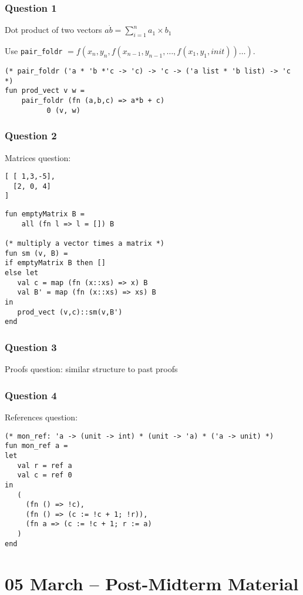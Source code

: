 \documentclass[11pt]{article}
\begin{document}
\subsubsection{Question 1}
Dot product of two vectors $a \dot b = \sum_{i=1}^n a_1 \times b_1$

Use \verb~pair_foldr~ $ = f(x_n,y_n,f(x_{n-1},y_{n-1}, \ldots, f(x_1, y_1, init)) \ldots )$.

\begin{verbatim}
(* pair_foldr ('a * 'b *'c -> 'c) -> 'c -> ('a list * 'b list) -> 'c *)
fun prod_vect v w =
    pair_foldr (fn (a,b,c) => a*b + c)
	      0 (v, w)
\end{verbatim}

\subsubsection{Question 2}
Matrices question:

\begin{verbatim}
[ [ 1,3,-5],
  [2, 0, 4]
]
\end{verbatim}

\begin{verbatim}
fun emptyMatrix B =
    all (fn l => l = []) B

(* multiply a vector times a matrix *)
fun sm (v, B) = 
if emptyMatrix B then []
else let
   val c = map (fn (x::xs) => x) B
   val B' = map (fn (x::xs) => xs) B
in
   prod_vect (v,c)::sm(v,B')
end
\end{verbatim}

\subsubsection{Question 3}
Proofs question: similar structure to past proofs

\subsubsection{Question 4}
References question:

\begin{verbatim}
(* mon_ref: 'a -> (unit -> int) * (unit -> 'a) * ('a -> unit) *)
fun mon_ref a = 
let
   val r = ref a
   val c = ref 0
in
   (
     (fn () => !c),
     (fn () => (c := !c + 1; !r)),
     (fn a => (c := !c + 1; r := a)
   )
end
\end{verbatim}

\section{05 March -- Post-Midterm Material}
\end{document}
